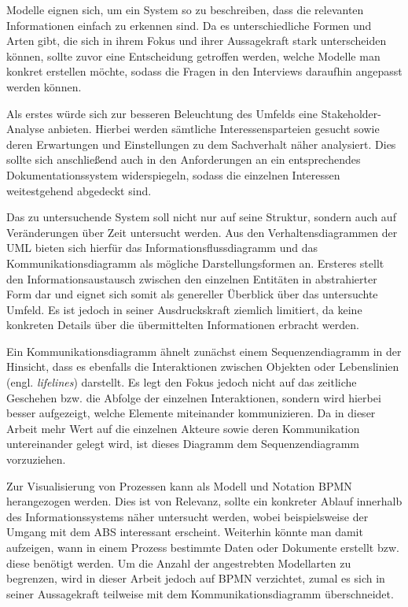 Modelle eignen sich, um ein System so zu beschreiben, dass die relevanten Informationen einfach zu erkennen sind. Da es unterschiedliche Formen und Arten gibt, die sich in ihrem Fokus und ihrer Aussagekraft stark unterscheiden können, sollte zuvor eine Entscheidung getroffen werden, welche Modelle man konkret erstellen möchte, sodass die Fragen in den Interviews daraufhin angepasst werden können.

Als erstes würde sich zur besseren Beleuchtung des Umfelds eine Stakeholder-Analyse anbieten. Hierbei werden sämtliche Interessensparteien gesucht sowie deren Erwartungen und Einstellungen zu dem Sachverhalt näher analysiert. Dies sollte sich anschließend auch in den Anforderungen an ein entsprechendes Dokumentationssystem widerspiegeln, sodass die einzelnen Interessen weitestgehend abgedeckt sind.

Das zu untersuchende System soll nicht nur auf seine Struktur, sondern auch auf Veränderungen über Zeit untersucht werden. Aus den Verhaltensdiagrammen der UML bieten sich hierfür das Informationsflussdiagramm und das Kommunikationsdiagramm als mögliche Darstellungsformen an. Ersteres stellt den Informationsaustausch zwischen den einzelnen Entitäten in abstrahierter Form dar und eignet sich somit als genereller Überblick über das untersuchte Umfeld. Es ist jedoch in seiner Ausdruckskraft ziemlich limitiert, da keine konkreten Details über die übermittelten Informationen erbracht werden.

Ein Kommunikationsdiagramm ähnelt zunächst einem Sequenzendiagramm in der Hinsicht, dass es ebenfalls die Interaktionen zwischen Objekten oder Lebenslinien (engl. \textit{lifelines}) darstellt. Es legt den Fokus jedoch nicht auf das zeitliche Geschehen bzw. die Abfolge der einzelnen Interaktionen, sondern wird hierbei besser aufgezeigt, welche Elemente miteinander kommunizieren. Da in dieser Arbeit mehr Wert auf die einzelnen Akteure sowie deren Kommunikation untereinander gelegt wird, ist dieses Diagramm dem Sequenzendiagramm vorzuziehen.

Zur Visualisierung von Prozessen kann als Modell und Notation BPMN herangezogen werden. Dies ist von Relevanz, sollte ein konkreter Ablauf innerhalb des Informationssystems näher untersucht werden, wobei beispielsweise der Umgang mit dem ABS interessant erscheint. Weiterhin könnte man damit aufzeigen, wann in einem Prozess bestimmte Daten oder Dokumente erstellt bzw. diese benötigt werden. Um die Anzahl der angestrebten Modellarten zu begrenzen, wird in dieser Arbeit jedoch auf BPMN verzichtet, zumal es sich in seiner Aussagekraft teilweise mit dem Kommunikationsdiagramm überschneidet.

